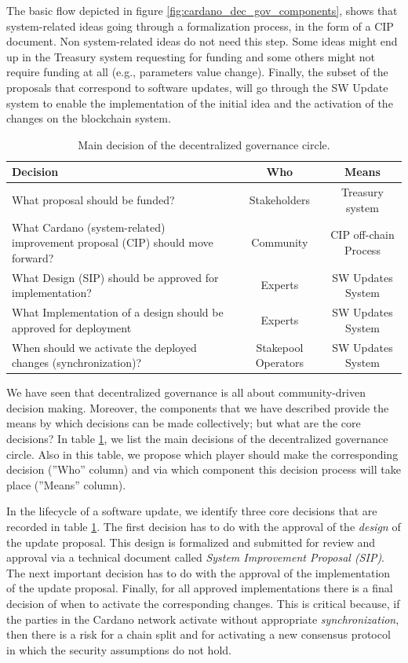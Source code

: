 The basic flow depicted in figure \ref{fig:cardano_dec_gov_components}, shows
that system-related ideas going through a formalization process, in the form of
a CIP document. Non system-related ideas do not need this step. Some ideas
might
end up in the Treasury system
requesting for funding and some others might not require funding at all (e.g.,
parameters value change). Finally, the subset of the proposals that correspond
to software updates, will go through the SW
Update system to enable the implementation of the initial idea and the
activation of the changes on the blockchain system.

\begin{table}[h!]
	\centering
	\begin{tabular}{|| p{6cm} | c | c ||}
		\hline
		Decision & Who & Means\\ [0.5ex]
		\hline\hline
		What proposal should be funded? & Stakeholders & Treasury system  \\
		\hline
		What Cardano (system-related) improvement proposal (CIP) should move
		forward? & Community & CIP off-chain Process  \\
		\hline
		What Design (SIP) should be approved for implementation? & Experts & SW
		Updates System  \\
		\hline
		What Implementation of a design should be approved for deployment &
		Experts & SW Updates System  \\
		\hline
		When should we activate the deployed changes (synchronization)? &
		Stakepool Operators & SW Updates System  \\ [1ex]
		\hline
	\end{tabular}
	\caption{Main decision of the decentralized governance circle.}
	\label{table:main_decisions}
\end{table}

We have seen that decentralized governance is all about community-driven
decision making. Moreover, the components that we have described provide the
means by which decisions can be made collectively; but what are the core
decisions? In table \ref{table:main_decisions}, we list the main decisions of
the decentralized governance circle. Also in this table, we propose which
player
should make the corresponding decision (''Who'' column) and via
which component this decision process will take place (''Means'' column).

In the lifecycle of a software update, we identify three core decisions that
are
recorded in table \ref{table:main_decisions}. The first decision has to do with
the approval of the \emph{design} of the update proposal. This design is
formalized and submitted for review and approval via a technical document
called \emph{System Improvement Proposal (SIP)}. The next important decision
has to do with the approval of the implementation of the update proposal.
Finally, for all approved implementations there is a final decision of when to
activate the corresponding changes. This is critical because, if the parties in
the Cardano network activate without appropriate \emph{synchronization}, then
there is a risk for a chain split and for activating a new consensus protocol
in which the security assumptions do not hold.

